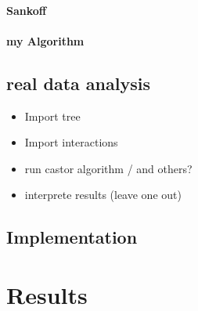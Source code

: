       \subsubsection{Sankoff}

      \subsubsection{my Algorithm}

  \section{real data analysis}
    \begin{itemize}
      \item Import tree
      \item Import interactions
      \item run castor algorithm / and others?
      \item interprete results (leave one out)
    \end{itemize}

  \section{Implementation}

\chapter{Results}

